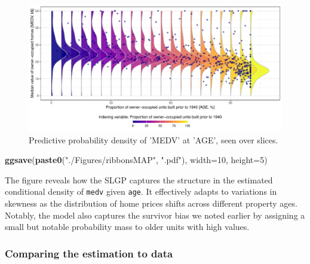 \documentclass[
]{article}
\newenvironment{Shaded}{\begin{snugshade}}{\end{snugshade}}
\newcommand{\AttributeTok}[1]{\textcolor[rgb]{0.13,0.29,0.53}{#1}}
\newcommand{\DecValTok}[1]{\textcolor[rgb]{0.00,0.00,0.81}{#1}}
\newcommand{\FunctionTok}[1]{\textcolor[rgb]{0.13,0.29,0.53}{\textbf{#1}}}
\newcommand{\NormalTok}[1]{#1}
\newcommand{\StringTok}[1]{\textcolor[rgb]{0.31,0.60,0.02}{#1}}
\begin{document}
\begin{figure}[H]

{\centering \includegraphics{IntroductionSLGP_files/figure-latex/SLGPplotting2-1} 

}

\caption{Predictive probability density of 'MEDV' at 'AGE', seen over slices.}\label{fig:SLGPplotting2}
\end{figure}

\begin{Shaded}
\begin{Highlighting}[]
\FunctionTok{ggsave}\NormalTok{(}\FunctionTok{paste0}\NormalTok{(}\StringTok{"./Figures/ribbonsMAP"}\NormalTok{,  }\StringTok{".pdf"}\NormalTok{), }\AttributeTok{width=}\DecValTok{10}\NormalTok{, }\AttributeTok{height=}\DecValTok{5}\NormalTok{)}
\end{Highlighting}
\end{Shaded}

The figure reveals how the SLGP captures the structure in the estimated conditional density of \texttt{medv} given \texttt{age}. It effectively adapts to variations in skewness as the distribution of home prices shifts across different property ages. Notably, the model also captures the survivor bias we noted earlier by assigning a small but notable probability mass to older units with high values.

\subsubsection{Comparing the estimation to data}\label{comparing-the-estimation-to-data}
\end{document}
